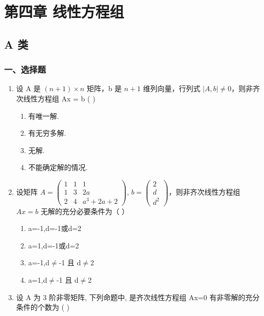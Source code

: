 \documentclass[12pt, a4paper]{ctexart}
\begin{document}
\section{第四章 线性方程组}

\subsection{A 类}

\subsubsection*{一、选择题}

\begin{enumerate}
    \item 设 A 是 $ (n+1) \times n $ 矩阵，b 是 $ n+1 $ 维列向量，行列式 $ |A, b| \neq 0 $，则非齐次线性方程组 Ax = b ( \underline{\hspace{1cm}} )
    \begin{enumerate}[label=(\Alph*)]
        \item 有唯一解.
        \item 有无穷多解.
        \item 无解.
        \item 不能确定解的情况.
    \end{enumerate}

    \item 设矩阵 $ A = \begin{pmatrix} 1 & 1 & 1 \\ 1 & 3 & 2a \\ 2 & 4 & a^{3} + 2a + 2 \end{pmatrix} $, $ b = \begin{pmatrix} 2 \\ d \\ d^{2} \end{pmatrix} $，则非齐次线性方程组 $ Ax = b $ 无解的充分必要条件为（ \underline{\hspace{1cm}} ）
    \begin{enumerate}[label=(\Alph*)]
        \item a=-1,d=-1或d=2
        \item a=1,d=-1或d=2
        \item a=-1,d$\neq$-1 且 d$\neq$2
        \item a=1,d$\neq$-1 且 d$\neq$2
    \end{enumerate}

    \item 设 A 为 3 阶非零矩阵, 下列命题中, 是齐次线性方程组 Ax=0 有非零解的充分条件的个数为 ( \underline{\hspace{1cm}} )
    

\end{enumerate}
\end{document}
